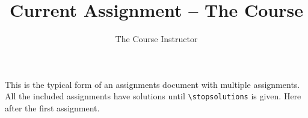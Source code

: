\documentclass[12pt,notes,hints,multiple,solutions]{hwexam}
\title{Current Assignment -- The Course}
\author{The Course Instructor}
\begin{document}
\maketitle

This is the typical form of an assignments document with  multiple assignments. All the
included assignments have solutions until \verb|\stopsolutions| is given. Here after the
first assignment.
\stopsolutions
{}
\end{document}
